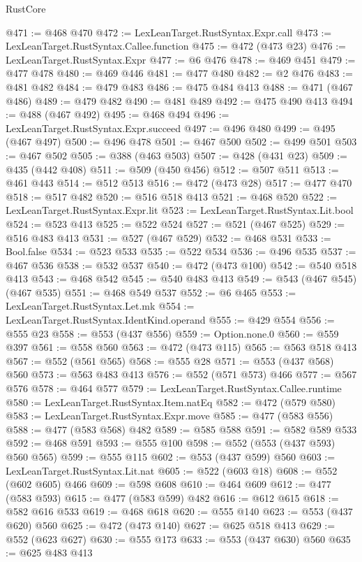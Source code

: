 \begin{lexlean}{RustCore}
\begin{coremodule}
@471 := @468 @470
@472 := LexLeanTarget.RustSyntax.Expr.call
@473 := LexLeanTarget.RustSyntax.Callee.function
@475 := @472 (@473 @23)
@476 := LexLeanTarget.RustSyntax.Expr
@477 := @6 @476
@478 := @469 @451
@479 := @477 @478
@480 := @469 @446
@481 := @477 @480
@482 := @2 @476
@483 := @481 @482
@484 := @479 @483
@486 := @475 @484 @413
@488 := @471 (@467 @486)
@489 := @479 @482
@490 := @481 @489
@492 := @475 @490 @413
@494 := @488 (@467 @492)
@495 := @468 @494
@496 := LexLeanTarget.RustSyntax.Expr.succeed
@497 := @496 @480
@499 := @495 (@467 @497)
@500 := @496 @478
@501 := @467 @500
@502 := @499 @501
@503 := @467 @502
@505 := @388 (@463 @503)
@507 := @428 (@431 @23)
@509 := @435 (@442 @408)
@511 := @509 (@450 @456)
@512 := @507 @511
@513 := @461 @443
@514 := @512 @513
@516 := @472 (@473 @28)
@517 := @477 @470
@518 := @517 @482
@520 := @516 @518 @413
@521 := @468 @520
@522 := LexLeanTarget.RustSyntax.Expr.lit
@523 := LexLeanTarget.RustSyntax.Lit.bool
@524 := @523 @413
@525 := @522 @524
@527 := @521 (@467 @525)
@529 := @516 @483 @413
@531 := @527 (@467 @529)
@532 := @468 @531
@533 := Bool.false
@534 := @523 @533
@535 := @522 @534
@536 := @496 @535
@537 := @467 @536
@538 := @532 @537
@540 := @472 (@473 @100)
@542 := @540 @518 @413
@543 := @468 @542
@545 := @540 @483 @413
@549 := @543 (@467 @545) (@467 @535)
@551 := @468 @549 @537
@552 := @6 @465
@553 := LexLeanTarget.RustSyntax.Let.mk
@554 := LexLeanTarget.RustSyntax.IdentKind.operand
@555 := @429 @554
@556 := @555 @23
@558 := @553 (@437 @556)
@559 := Option.none.{0}
@560 := @559 @397
@561 := @558 @560
@563 := @472 (@473 @115)
@565 := @563 @518 @413
@567 := @552 (@561 @565)
@568 := @555 @28
@571 := @553 (@437 @568) @560
@573 := @563 @483 @413
@576 := @552 (@571 @573) @466
@577 := @567 @576
@578 := @464 @577
@579 := LexLeanTarget.RustSyntax.Callee.runtime
@580 := LexLeanTarget.RustSyntax.Item.natEq
@582 := @472 (@579 @580)
@583 := LexLeanTarget.RustSyntax.Expr.move
@585 := @477 (@583 @556)
@588 := @477 (@583 @568) @482
@589 := @585 @588
@591 := @582 @589 @533
@592 := @468 @591
@593 := @555 @100
@598 := @552 (@553 (@437 @593) @560 @565)
@599 := @555 @115
@602 := @553 (@437 @599) @560
@603 := LexLeanTarget.RustSyntax.Lit.nat
@605 := @522 (@603 @18)
@608 := @552 (@602 @605) @466
@609 := @598 @608
@610 := @464 @609
@612 := @477 (@583 @593)
@615 := @477 (@583 @599) @482
@616 := @612 @615
@618 := @582 @616 @533
@619 := @468 @618
@620 := @555 @140
@623 := @553 (@437 @620) @560
@625 := @472 (@473 @140)
@627 := @625 @518 @413
@629 := @552 (@623 @627)
@630 := @555 @173
@633 := @553 (@437 @630) @560
@635 := @625 @483 @413

\end{coremodule}
\end{lexlean}
